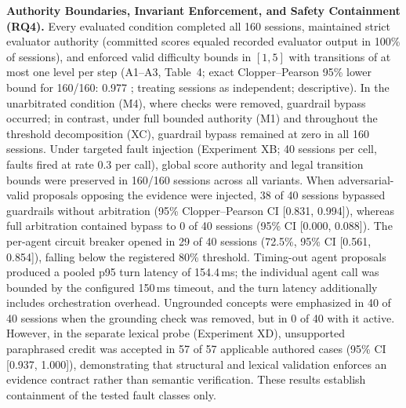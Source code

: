 \documentclass[runningheads]{llncs}
\begin{document}
\textbf{Authority Boundaries, Invariant Enforcement, and Safety Containment (RQ4).} Every evaluated condition completed all 160 sessions, maintained strict evaluator authority (committed scores equaled recorded evaluator output in 100\% of sessions), and enforced valid difficulty bounds in $[1,5]$ with transitions of at most one level per step (A1--A3, Table~4; exact Clopper--Pearson 95\% lower bound for 160/160: 0.977 \cite{clopper1934}; treating sessions as independent; descriptive). In the unarbitrated condition (M4), where checks were removed, guardrail bypass occurred; in contrast, under full bounded authority (M1) and throughout the threshold decomposition (XC), guardrail bypass remained at zero in all 160 sessions. Under targeted fault injection (Experiment XB; 40 sessions per cell, faults fired at rate 0.3 per call), global score authority and legal transition bounds were preserved in 160/160 sessions across all variants. When adversarial-valid proposals opposing the evidence were injected, 38 of 40 sessions bypassed guardrails without arbitration (95\% Clopper--Pearson CI [0.831, 0.994]), whereas full arbitration contained bypass to 0 of 40 sessions (95\% CI [0.000, 0.088]). The per-agent circuit breaker opened in 29 of 40 sessions (72.5\%, 95\% CI [0.561, 0.854]), falling below the registered 80\% threshold. Timing-out agent proposals produced a pooled p95 turn latency of 154.4\,ms; the individual agent call was bounded by the configured 150\,ms timeout, and the turn latency additionally includes orchestration overhead. Ungrounded concepts were emphasized in 40 of 40 sessions when the grounding check was removed, but in 0 of 40 with it active. However, in the separate lexical probe (Experiment XD), unsupported paraphrased credit was accepted in 57 of 57 applicable authored cases (95\% CI [0.937, 1.000]), demonstrating that structural and lexical validation enforces an evidence contract rather than semantic verification. These results establish containment of the tested fault classes only.
\end{document}
